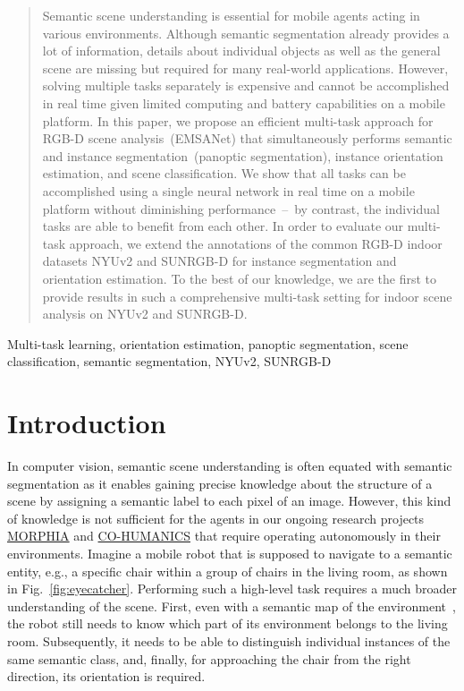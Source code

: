 \documentclass[conference]{IEEEtran}
\begin{document}
\begin{abstract}
Semantic scene understanding is essential for mobile agents acting in various environments.
Although semantic segmentation already provides a lot of information, details about individual objects as well as the general scene are missing but required for many real-world applications.
However, solving multiple tasks separately is expensive and cannot be accomplished in real time given limited computing and battery capabilities on a mobile platform. 
In this paper, we propose an efficient multi-task approach for RGB-D scene analysis~(EMSANet) that simultaneously performs semantic and instance segmentation~(panoptic segmentation), instance orientation estimation, and scene classification.
We show that all tasks can be accomplished using a single neural network in real time on a mobile platform without diminishing performance\mbox{~--~}by contrast, the individual tasks are able to benefit from each other.
In order to evaluate our multi-task approach, we extend the annotations of the common RGB-D indoor datasets NYUv2 and SUNRGB-D for instance segmentation and orientation estimation. 
To the best of our knowledge, we are the first to provide results in such a comprehensive multi-task setting for indoor scene analysis on NYUv2 and SUNRGB-D. 

\end{abstract}

\begin{IEEEkeywords}
Multi-task learning, 
orientation estimation, 
panoptic segmentation, 
scene classification, 
semantic segmentation,
NYUv2, SUNRGB-D
\end{IEEEkeywords}
 

\section{Introduction}
\label{sec:introduction}

In computer vision, semantic scene understanding is often equated with semantic segmentation as it enables gaining precise knowledge about the structure of a scene by assigning a semantic label to each pixel of an image.
However, this kind of knowledge is not sufficient for the agents in our ongoing research projects \href{http://morphia-projekt.de/}{MORPHIA} and \href{http://co-humanics.de/}{CO-HUMANICS} that require operating autonomously in their environments.
Imagine a mobile robot that is supposed to navigate to a semantic entity, e.g., a specific chair within a group of chairs in the living room, as shown in Fig.~\ref{fig:eyecatcher}. 
Performing such a high-level task requires a much broader understanding of the scene.
First, even with a semantic map of the environment~\cite{semanticmapping2022icra}, the robot still needs to know which part of its environment belongs to the living room.
Subsequently, it needs to be able to distinguish individual instances of the same semantic class, and, finally, for approaching the chair from the right direction, its orientation is required.
\end{document}
